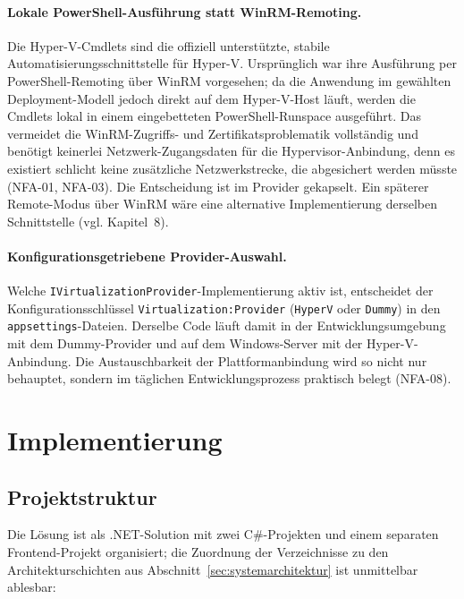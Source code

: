\documentclass[12pt,a4paper]{article}
\begin{document}
\paragraph{Lokale PowerShell-Ausführung statt WinRM-Remoting.} Die Hyper-V-Cmdlets sind die offiziell unterstützte, stabile Automatisierungsschnittstelle für Hyper-V. Ursprünglich war ihre Ausführung per PowerShell-Remoting über WinRM vorgesehen; da die Anwendung im gewählten Deployment-Modell jedoch direkt auf dem Hyper-V-Host läuft, werden die Cmdlets lokal in einem eingebetteten PowerShell-Runspace ausgeführt. Das vermeidet die WinRM-Zugriffs- und Zertifikatsproblematik vollständig und benötigt keinerlei Netzwerk-Zugangsdaten für die Hypervisor-Anbindung, denn es existiert schlicht keine zusätzliche Netzwerkstrecke, die abgesichert werden müsste (NFA-01, NFA-03). Die Entscheidung ist im Provider gekapselt. Ein späterer Remote-Modus über WinRM wäre eine alternative Implementierung derselben Schnittstelle (vgl. Kapitel~8).

\paragraph{Konfigurationsgetriebene Provider-Auswahl.} Welche \texttt{IVirtualizationProvider}-Implementierung aktiv ist, entscheidet der Konfigurationsschlüssel \texttt{Virtualization:Provider} (\texttt{HyperV} oder \texttt{Dummy}) in den \texttt{appsettings}-Dateien. Derselbe Code läuft damit in der Entwicklungsumgebung mit dem Dummy-Provider und auf dem Windows-Server mit der Hyper-V-Anbindung. Die Austauschbarkeit der Plattformanbindung wird so nicht nur behauptet, sondern im täglichen Entwicklungsprozess praktisch belegt (NFA-08).

\newpage
\section{Implementierung}

\subsection{Projektstruktur}
\label{sec:projektstruktur}

Die Lösung ist als .NET-Solution mit zwei C\#-Projekten und einem separaten Frontend-Projekt organisiert; die Zuordnung der Verzeichnisse zu den Architekturschichten aus Abschnitt~\ref{sec:systemarchitektur} ist unmittelbar ablesbar:
\end{document}
